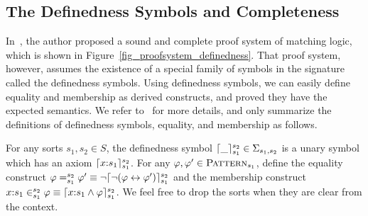 \documentclass[acmsmall]{acmart}
\theoremstyle{acmdefinition}
\newcommand{\dimp}{\leftrightarrow}
\newcommand{\Pattern}{\textnormal{\textsc{Pattern}}}
\newcommand{\cln}{{:}}
\DeclarePairedDelimiter{\ceil}{\lceil}{\rceil}
\newcommand{\SigmaSub}[1]{\Sigma_{#1}}
\newcommand{\Figure}[1]{Figure~\ref{#1}}
\begin{document}
\subsection{The Definedness Symbols and Completeness}

In~\cite{rosu-2017-lmcs},
the author proposed a sound and complete proof system of matching logic,
which is shown in \Figure{fig_proofsystem_definedness}.
That proof system, however, assumes the existence of
a special family of symbols in the signature called the definedness symbols.
Using definedness symbols,
we can easily define equality and membership
as derived constructs,
and proved they have the expected semantics.
We refer to~\cite{rosu-2017-lmcs} for more details,
and only summarize the definitions of definedness symbols, 
equality, and membership as follows.

\begin{definition}
For any sorts $s_1,s_2 \in S$, the definedness symbol
$\ceil{\_}_{s_1}^{s_2} \in \SigmaSub{s_1,s_2}$
is a unary symbol which has an axiom
$
\ceil{x \cln s_1}_{s_1}^{s_2}
$.
For any $\varphi,\varphi' \in \Pattern_{s_1}$,
define the equality construct
$
\varphi =_{s_1}^{s_2} \varphi'
\equiv
\neg \ceil{ \neg ( \varphi \dimp \varphi' ) }_{s_1}^{s_2}
$
and the membership construct
$
x \cln s_1 \in_{s_1}^{s_2} \varphi
\equiv
\ceil{ x \cln s_1 \wedge \varphi }_{s_1}^{s_2}
$.
We feel free to drop the sorts when they are clear from the context.
\end{definition}
\end{document}
